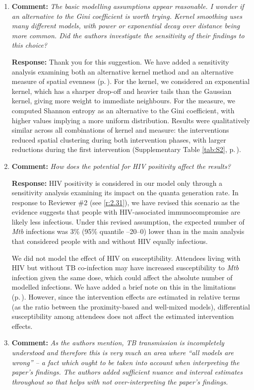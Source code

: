 \documentclass[11pt]{article}
\newcommand{\comment}[1]{\textbf{Comment:} \textit{#1}}
\newcommand{\response}[1]{\textbf{Response:} #1}
\begin{document}
\begin{enumerate}[label=\textbf{R3.\arabic*.}, leftmargin=*]
\item\label{r:3.3} \comment{The basic modelling assumptions appear reasonable. I wonder if an alternative to the Gini coefficient is worth trying. Kernel smoothing uses many different models, with power or exponential decay over distance being more common. Did the authors investigate the sensitivity of their findings to this choice?}

\response{Thank you for this suggestion. We have added a sensitivity analysis examining both an alternative kernel method and an alternative measure of spatial evenness (p.\,\pageref{chg:R3.3}). For the kernel, we considered an exponential kernel, which has a sharper drop-off and heavier tails than the Gaussian kernel, giving more weight to immediate neighbours. For the measure, we computed Shannon entropy as an alternative to the Gini coefficient, with higher values implying a more uniform distribution. Results were qualitatively similar across all combinations of kernel and measure: the interventions reduced spatial clustering during both intervention phases, with larger reductions during the first intervention (Supplementary Table \ref{tab:S2}, p.\,\pageref{chg:R3.3results}).}

\item\label{r:3.4} \comment{How does the potential for HIV positivity affect the results?}

\response{HIV positivity is considered in our model only through a sensitivity analysis examining its impact on the quanta generation rate. In response to Reviewer \#2 (see \ref{r:2.31}), we have revised this scenario as the evidence suggests that people with HIV-associated immunocompromise are likely less infectious. Under this revised assumption, the expected number of \emph{Mtb} infections was 3\% (95\% quantile --20--0) lower than in the main analysis that considered people with and without HIV equally infectious.

We did not model the effect of HIV on susceptibility. Attendees living with HIV but without TB co-infection may have increased susceptibility to \emph{Mtb} infection given the same dose, which could affect the absolute number of modelled infections. We have added a brief note on this in the limitations (p.\,\pageref{chg:R3.4}). However, since the intervention effects are estimated in relative terms (as the ratio between the proximity-based and well-mixed models), differential susceptibility among attendees does not affect the estimated intervention effects.}

\item\label{r:3.5} \comment{As the authors mention, TB transmission is incompletely understood and therefore this is very much an area where ``all models are wrong'' -- a fact which ought to be taken into account when interpreting the paper's findings. The authors added sufficient nuance and interval estimates throughout so that helps with not over-interpreting the paper's findings.}


\end{enumerate}
\end{document}
